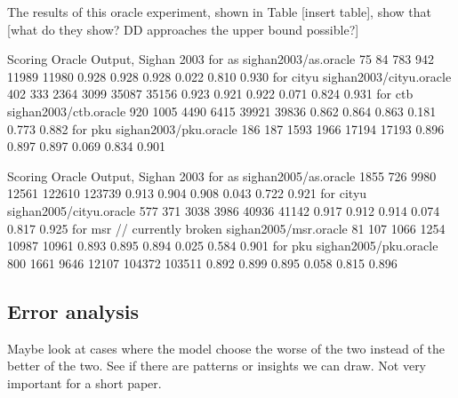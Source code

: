 The results of this oracle experiment, shown in Table [insert table], show that [what do they show? DD approaches the upper bound possible?]

Scoring Oracle Output, Sighan 2003
for as
	sighan2003/as.oracle	75	84	783	942	11989	11980	0.928	0.928	0.928	0.022	0.810	0.930
for cityu
	sighan2003/cityu.oracle	402	333	2364	3099	35087	35156	0.923	0.921	0.922	0.071	0.824	0.931
for ctb
	sighan2003/ctb.oracle	920	1005	4490	6415	39921	39836	0.862	0.864	0.863	0.181	0.773	0.882
for pku
	sighan2003/pku.oracle	186	187	1593	1966	17194	17193	0.896	0.897	0.897	0.069	0.834	0.901

Scoring Oracle Output, Sighan 2003
for as
	sighan2005/as.oracle	1855	726	9980	12561	122610	123739	0.913	0.904	0.908	0.043	0.722	0.921
for cityu
	sighan2005/cityu.oracle	577	371	3038	3986	40936	41142	0.917	0.912	0.914	0.074	0.817	0.925
for msr // currently broken
	sighan2005/msr.oracle	81	107	1066	1254	10987	10961	0.893	0.895	0.894	0.025	0.584	0.901
for pku
	sighan2005/pku.oracle	800	1661	9646	12107	104372	103511	0.892	0.899	0.895	0.058	0.815	0.896


\subsection{Error analysis}
Maybe look at cases where the model choose the worse of the two instead of the better of the two. See if there are patterns or insights we can draw. Not very important for a short paper.